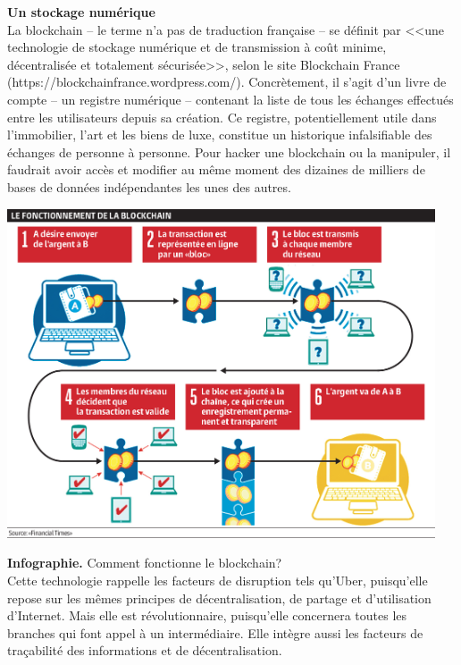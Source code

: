 \documentclass[11pt,twoside,a4paper]{article}
\begin{document}
\textbf{Un stockage num{\'e}rique}~\\

La blockchain -- le terme n'a pas de traduction fran\c{c}aise -- se d{\'e}finit par <<une technologie de stockage num{\'e}rique et de transmission {\`a} co{\^u}t minime, d{\'e}centralis{\'e}e et totalement s{\'e}curis{\'e}e>>, selon le site Blockchain France (https://blockchainfrance.wordpress.com/). Concr{\`e}tement, il s'agit d'un livre de compte -- un registre num{\'e}rique -- contenant la liste de tous les {\'e}changes effectu{\'e}s entre les utilisateurs depuis sa cr{\'e}ation. Ce registre, potentiellement utile dans l'immobilier, l'art et les biens de luxe, constitue un historique infalsifiable des {\'e}changes de personne {\`a} personne. Pour hacker une blockchain ou la manipuler, il faudrait avoir acc{\`e}s et modifier au m{\^e}me moment des dizaines de milliers de bases de donn{\'e}es ind{\'e}pendantes les unes des autres. ~\\

\begin{minipage}[h]{0.75\textwidth}
	\includegraphics[width=0.95\textwidth]{img/L17_Blockchain258_0.jpg}
\end{minipage} \hfill \begin{minipage}[h]{0.23\textwidth}
	\textbf{Infographie. }Comment fonctionne le blockchain?~\\

	Cette technologie rappelle les facteurs de disruption tels qu'Uber, puisqu'elle repose sur les m{\^e}mes principes de d{\'e}centralisation, de partage et d'utilisation d'Internet. Mais elle est r{\'e}volutionnaire, puisqu'elle concernera toutes les branches qui font appel {\`a} un interm{\'e}diaire. Elle int{\`e}gre aussi les facteurs de tra\c{c}abilit{\'e} des informations et de d{\'e}centralisation. ~\\
\end{minipage} ~\\~\\
\end{document}
